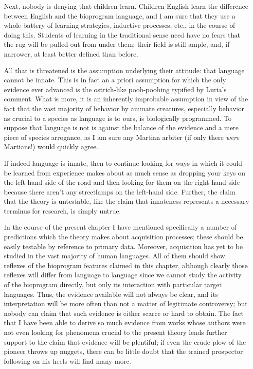 Next, nobody is denying that children learn. Children  English learn the difference between English and the bioprogram language, and I am sure that they use a whole battery of learning strategies, inductive processes, etc., in the course of doing this. Students of learning in the traditional sense need have no fears that the rug will be pulled out from under them; their field is still ample, and, if narrower, at least better defined than before.

All that is threatened is the assumption underlying their attitude: that language cannot be innate. This is in fact an a priori assumption for which the only evidence ever advanced is the ostrich-like pooh-poohing typified by Luria's comment. What is more, it is an inherently improbable assumption in view of the fact that the vast majority of behavior by animate creatures, especially behavior as crucial to a species as language is to ours, is biologically programmed. To suppose that language is not is against the balance of the evidence and a mere piece of species arrogance, as I am sure any Martian arbiter (if only there \textit{were} Martians!) would quickly agree.

If indeed language is innate, then to continue looking for ways in which it could be learned from experience makes about as much sense as dropping your keys on the left-hand side of the road and then looking for them on the right-hand side because there aren't any streetlamps on the left-hand side. Further, the claim that the theory is untestable, like the claim that innateness represents a necessary terminus for research, is simply untrue.


In the course of the present chapter I have mentioned specifically a number of predictions which the theory makes about acquisition processes; these should be easily testable by reference to primary data. Moreover, acquisition has yet to be studied in the vast majority of human languages. All of them should show reflexes of the bioprogram features claimed in this chapter, although clearly those reflexes will differ from language to language since we cannot study the activity of the bioprogram directly, but only its interaction with particular target languages. Thus, the evidence available will not always be clear, and its interpretation will be more often than not a matter of legitimate controversy; but nobody can claim that such evidence is either scarce or hard to obtain. The fact that I have been able to derive so much evidence from works whose authors were not even looking for phenomena crucial to the present theory lends further support to the claim that evidence will be plentiful; if even the crude plow of the pioneer throws up nuggets, there can be little doubt that the trained prospector following on his heels will find many more.

